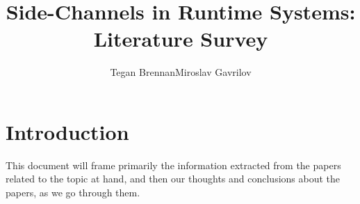 \documentclass{article}
\begin{document}
     
\title{Side-Channels in Runtime Systems:\\ Literature Survey}
\author{Tegan Brennan\qquad Miroslav Gavrilov}
\maketitle

\section*{Introduction}

This document will frame primarily the information extracted from the papers related to the topic at hand, and then our thoughts and conclusions about the papers, as we go through them.



\end{document}
